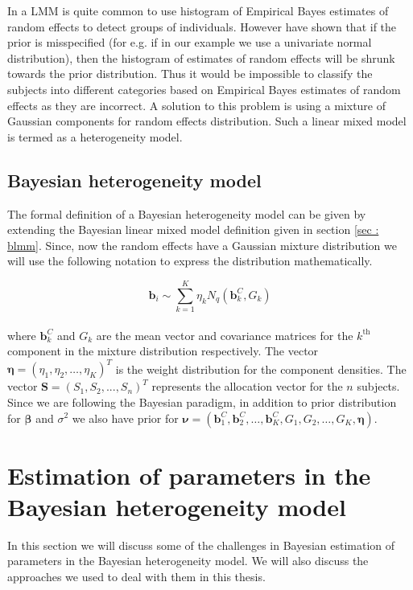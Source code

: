 In a LMM is quite common to use histogram of Empirical Bayes estimates of random effects to detect groups of individuals. However \citet{verbeke_linear_1996} have shown that if the prior is misspecified (for e.g. if in our example we use a univariate normal distribution), then the histogram of estimates of random effects will be shrunk towards the prior distribution. Thus it would be impossible to classify the subjects into different categories based on Empirical Bayes estimates of random effects as they are incorrect. A solution to this problem is using a mixture of Gaussian components for random effects distribution. Such a linear mixed model is termed as a heterogeneity model.

\subsection{Bayesian heterogeneity model}
\label{subsec : bhtge}
The formal definition of a Bayesian heterogeneity model can be given by extending the Bayesian linear mixed model definition given in section \ref{sec : blmm}. Since, now the random effects have a Gaussian mixture distribution we will use the following notation to express the distribution mathematically.

$$\boldsymbol{b}_i \sim \sum_{k=1}^{K} \eta_k N_q(\boldsymbol{b}_k^C, G_k)$$\\
where $\boldsymbol{b}_k^C$ and $G_k$ are the mean vector and covariance matrices for the $k^\text{th}$ component in the mixture distribution respectively. The vector $\boldsymbol{\eta} = (\eta_1, \eta_2, \ldots, \eta_K)^T$ is the weight distribution for the component densities. The vector $\boldsymbol{S}=(S_1, S_2, ..., S_n)^T$ represents the allocation vector for the $n$ subjects. Since we are following the Bayesian paradigm, in addition to prior distribution for $\boldsymbol{\beta}$ and $\sigma^2$ we also have prior for $\boldsymbol{\nu} = (\boldsymbol{b}_1^C, \boldsymbol{b}_2^C, \ldots, \boldsymbol{b}_K^C, G_1, G_2, \ldots, G_K, \boldsymbol{\eta})$.

\section{Estimation of parameters in the Bayesian heterogeneity model}
In this section we will discuss some of the challenges in Bayesian estimation of parameters in the Bayesian heterogeneity model. We will also discuss the approaches we used to deal with them in this thesis.

